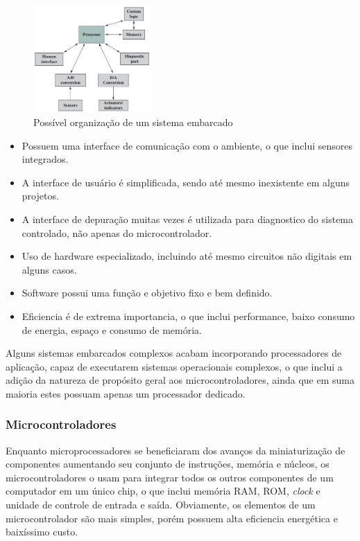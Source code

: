 \documentclass{article}
\begin{document}
\begin{figure}[h]
  \centering
  \includegraphics[width=0.4\textwidth]{embarcado.png}
  \caption{Possível organização de um sistema embarcado}
\end{figure}

\begin{itemize}
\item Possuem uma interface de comunicação com o ambiente,
  o que inclui sensores integrados.

\item A interface de usuário é simplificada, sendo até mesmo
  inexistente em alguns projetos.

\item A interface de depuração muitas vezes é utilizada para
  diagnostico do sistema controlado, não apenas do microcontrolador.

\item Uso de hardware especializado, incluindo até mesmo circuitos
  não digitais em alguns casos.

\item Software possui uma função e objetivo fixo e bem definido.

\item Eficiencia é de extrema importancia, o que inclui performance,
  baixo consumo de energia, espaço e consumo de memória.
\end{itemize}

Alguns sistemas embarcados complexos acabam incorporando processadores
de aplicação, capaz de executarem sistemas operacionais complexos, o
que inclui a adição da natureza de propósito geral aos
microcontroladores, ainda que em suma maioria estes possuam apenas um
processador dedicado.

\subsubsection{Microcontroladores}
Enquanto microprocessadores se beneficiaram dos avanços da
miniaturização de componentes aumentando seu conjunto de instruções,
memória e núcleos, os microcontroladores o usam para integrar todos os
outros componentes de um computador em um único chip, o que inclui
memória RAM, ROM, \textit{clock} e unidade de controle de entrada e
saída. Obviamente, os elementos de um microcontrolador são mais
simples, porém possuem alta eficiencia energética e baixíssimo custo.
\end{document}
